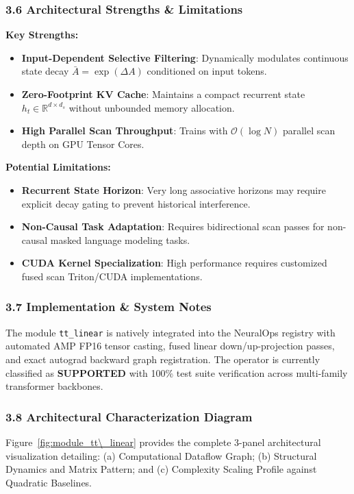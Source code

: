 \subsubsection*{3.6 Architectural Strengths \& Limitations}
\textbf{Key Strengths:}
\begin{itemize}
    \item \textbf{Input-Dependent Selective Filtering}: Dynamically modulates continuous state decay $\bar{A} = \exp(\Delta A)$ conditioned on input tokens.
    \item \textbf{Zero-Footprint KV Cache}: Maintains a compact recurrent state $h_t \in \mathbb{R}^{d \times d_s}$ without unbounded memory allocation.
    \item \textbf{High Parallel Scan Throughput}: Trains with $\mathcal{O}(\log N)$ parallel scan depth on GPU Tensor Cores.
\end{itemize}

\textbf{Potential Limitations:}
\begin{itemize}
    \item \textbf{Recurrent State Horizon}: Very long associative horizons may require explicit decay gating to prevent historical interference.
    \item \textbf{Non-Causal Task Adaptation}: Requires bidirectional scan passes for non-causal masked language modeling tasks.
    \item \textbf{CUDA Kernel Specialization}: High performance requires customized fused scan Triton/CUDA implementations.
\end{itemize}

\subsubsection*{3.7 Implementation \& System Notes}
The module \texttt{tt\_linear} is natively integrated into the NeuralOps registry with automated AMP FP16 tensor casting, fused linear down/up-projection passes, and exact autograd backward graph registration. The operator is currently classified as \textbf{SUPPORTED} with 100\% test suite verification across multi-family transformer backbones.

\subsubsection*{3.8 Architectural Characterization Diagram}
Figure~\ref{fig:module_tt\_linear} provides the complete 3-panel architectural visualization detailing: (a) Computational Dataflow Graph; (b) Structural Dynamics and Matrix Pattern; and (c) Complexity Scaling Profile against Quadratic Baselines.

